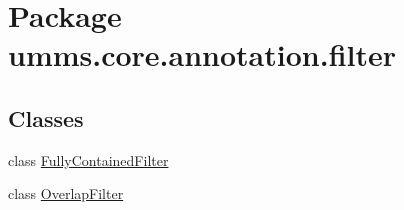 \hypertarget{namespaceumms_1_1core_1_1annotation_1_1filter}{\section{Package umms.\+core.\+annotation.\+filter}
\label{namespaceumms_1_1core_1_1annotation_1_1filter}
}
\subsection*{Classes}
\begin{DoxyCompactItemize}
\item 
class \hyperlink{classumms_1_1core_1_1annotation_1_1filter_1_1_fully_contained_filter}{Fully\+Contained\+Filter}
\item 
class \hyperlink{classumms_1_1core_1_1annotation_1_1filter_1_1_overlap_filter}{Overlap\+Filter}
\end{DoxyCompactItemize}
